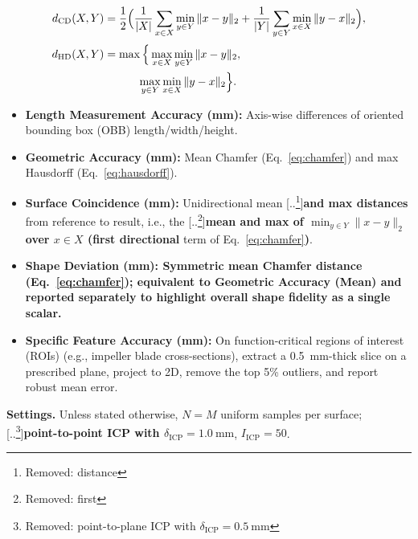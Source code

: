 \documentclass{ieeeaccess}
\providecommand{\DIFaddtex}[1]{{\color{blue}\bfseries #1}} %
\providecommand{\DIFdeltex}[1]{{\color{red}[..\footnote{\color{black}Removed: #1}]}} %
\providecommand{\DIFaddbegin}{} %
\providecommand{\DIFaddend}{} %
\providecommand{\DIFdelbegin}{} %
\providecommand{\DIFdelend}{} %
\providecommand{\DIFadd}[1]{\texorpdfstring{\DIFaddtex{#1}}{#1}} %
\providecommand{\DIFdel}[1]{\texorpdfstring{\DIFdeltex{#1}}{}} %
\begin{document}
\DIFdelbegin %
\DIFdelend \DIFaddbegin \begin{align}
d_{\mathrm{CD}}(X,Y)
  &= \frac{1}{2}\Bigl(
      \frac{1}{|X|}\sum_{x\in X}\min_{y\in Y}\|x-y\|_2
      + \frac{1}{|Y|}\sum_{y\in Y}\min_{x\in X}\|y-x\|_2
     \Bigr),
  \label{eq:chamfer}
\\[2pt]
d_{\mathrm{HD}}(X,Y)
  &= \max\Big\{
        \max_{x\in X}\min_{y\in Y}\|x-y\|_2, \notag\\
  &\qquad\quad
        \max_{y\in Y}\min_{x\in X}\|y-x\|_2
     \Big\}.
  \label{eq:hausdorff}
\end{align}
\DIFaddend 


\begin{itemize}
  \item \textbf{Length Measurement Accuracy (mm):} Axis-wise differences of oriented bounding box (OBB) length/width/height.
  \item \textbf{Geometric Accuracy (mm):} Mean Chamfer (Eq.~\eqref{eq:chamfer}) and max Hausdorff (Eq.~\eqref{eq:hausdorff}).
  \item \textbf{Surface Coincidence (mm):} Unidirectional mean \DIFdelbegin \DIFdel{distance }\DIFdelend \DIFaddbegin \DIFadd{and max distances }\DIFaddend from reference to result, i.e., the \DIFdelbegin \DIFdel{first }\DIFdelend \DIFaddbegin \DIFadd{mean and max of $\min_{y\in Y}\|x-y\|_2$ over $x\in X$ (first directional }\DIFaddend term of Eq.~\eqref{eq:chamfer}\DIFaddbegin \DIFadd{)}\DIFaddend .
  \item \DIFaddbegin \DIFadd{\textbf{Shape Deviation (mm):} Symmetric mean Chamfer distance (Eq.~\eqref{eq:chamfer}); equivalent to Geometric Accuracy (Mean) and reported separately to highlight overall shape fidelity as a single scalar.
  }\item \DIFaddend \textbf{Specific Feature Accuracy (mm):} On function-critical regions of interest (ROIs) (e.g., impeller blade cross-sections), extract a \SI{0.5}{\milli\meter}-thick slice on a prescribed plane, project to 2D, remove the top 5\% outliers, and report robust mean error.
\end{itemize}
\textbf{Settings.} Unless stated otherwise, \(N=M\) uniform samples per surface; \DIFdelbegin \DIFdel{point-to-plane ICP with \(\delta_{\mathrm{ICP}}=\SI{0.5}{\milli\meter}\)}\DIFdelend \DIFaddbegin \DIFadd{point-to-point ICP with \(\delta_{\mathrm{ICP}}=\SI{1.0}{\milli\meter}\)}\DIFaddend , \(I_{\mathrm{ICP}}=50\).
\end{document}

